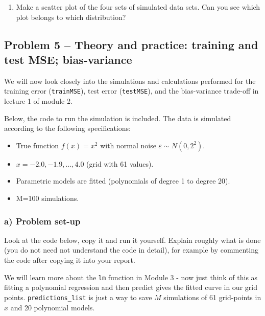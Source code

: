 \documentclass[
]{article}
\providecommand{\tightlist}{%
  \setlength{\itemsep}{0pt}\setlength{\parskip}{0pt}}
\begin{document}
\begin{enumerate}
\def\labelenumi{\alph{enumi})}
\setcounter{enumi}{1}
\tightlist
\item
  Make a scatter plot of the four sets of simulated data sets. Can you
  see which plot belongs to which distribution?
\end{enumerate}

\subsection{Problem 5 -- Theory and practice: training and test MSE;
bias-variance}\label{problem-5-theory-and-practice-training-and-test-mse-bias-variance}

We will now look closely into the simulations and calculations performed
for the training error (\texttt{trainMSE}), test error
(\texttt{testMSE}), and the bias-variance trade-off in lecture 1 of
module 2.

Below, the code to run the simulation is included. The data is simulated
according to the following specifications:

\begin{itemize}
\tightlist
\item
  True function \(f(x)=x^2\) with normal noise
  \(\varepsilon \sim N(0,2^2)\).
\item
  \(x= -2.0, -1.9, ... ,4.0\) (grid with 61 values).
\item
  Parametric models are fitted (polynomials of degree 1 to degree 20).
\item
  M=100 simulations.
\end{itemize}

\subsubsection{a) Problem set-up}\label{a-problem-set-up}

Look at the code below, copy it and run it yourself. Explain roughly
what is done (you do not need not understand the code in detail), for
example by commenting the code after copying it into your report.

We will learn more about the \texttt{lm} function in Module 3 - now just
think of this as fitting a polynomial regression and then predict gives
the fitted curve in our grid points. \texttt{predictions\_list} is just
a way to save \(M\) simulations of 61 grid-points in \(x\) and 20
polynomial models.
\end{document}
